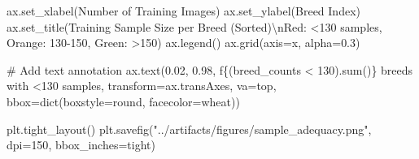 \documentclass[
  letterpaper,
  DIV=11,
  numbers=noendperiod]{scrartcl}
\newenvironment{Shaded}{\begin{snugshade}}{\end{snugshade}}
\newcommand{\BuiltInTok}[1]{\textcolor[rgb]{0.00,0.23,0.31}{#1}}
\newcommand{\CharTok}[1]{\textcolor[rgb]{0.13,0.47,0.30}{#1}}
\newcommand{\CommentTok}[1]{\textcolor[rgb]{0.37,0.37,0.37}{#1}}
\newcommand{\DecValTok}[1]{\textcolor[rgb]{0.68,0.00,0.00}{#1}}
\newcommand{\FloatTok}[1]{\textcolor[rgb]{0.68,0.00,0.00}{#1}}
\newcommand{\NormalTok}[1]{\textcolor[rgb]{0.00,0.23,0.31}{#1}}
\newcommand{\OperatorTok}[1]{\textcolor[rgb]{0.37,0.37,0.37}{#1}}
\newcommand{\SpecialCharTok}[1]{\textcolor[rgb]{0.37,0.37,0.37}{#1}}
\newcommand{\SpecialStringTok}[1]{\textcolor[rgb]{0.13,0.47,0.30}{#1}}
\newcommand{\StringTok}[1]{\textcolor[rgb]{0.13,0.47,0.30}{#1}}
\renewenvironment{Shaded}{%
  \begin{tcolorbox}[%
    enhanced,%
    colback=codebg,%
    colframe=codebg,%
    borderline west={3pt}{0pt}{sectionblue},%
    boxrule=0pt,%
    arc=0pt,%
    boxsep=5pt,%
    left=2mm,%
    right=2mm,%
    top=2mm,%
    bottom=2mm%
  ]%
}{%
  \end{tcolorbox}%
}
\begin{document}
\begin{Shaded}
\begin{Highlighting}[]
\NormalTok{ax.set\_xlabel(}\StringTok{\textquotesingle{}Number of Training Images\textquotesingle{}}\NormalTok{)}
\NormalTok{ax.set\_ylabel(}\StringTok{\textquotesingle{}Breed Index\textquotesingle{}}\NormalTok{)}
\NormalTok{ax.set\_title(}\StringTok{\textquotesingle{}Training Sample Size per Breed (Sorted)}\CharTok{\textbackslash{}n}\StringTok{Red: \textless{}130 samples, Orange: 130{-}150, Green: \textgreater{}150\textquotesingle{}}\NormalTok{)}
\NormalTok{ax.legend()}
\NormalTok{ax.grid(axis}\OperatorTok{=}\StringTok{\textquotesingle{}x\textquotesingle{}}\NormalTok{, alpha}\OperatorTok{=}\FloatTok{0.3}\NormalTok{)}

\CommentTok{\# Add text annotation}
\NormalTok{ax.text(}\FloatTok{0.02}\NormalTok{, }\FloatTok{0.98}\NormalTok{, }\SpecialStringTok{f\textquotesingle{}}\SpecialCharTok{\{}\NormalTok{(breed\_counts }\OperatorTok{\textless{}} \DecValTok{130}\NormalTok{)}\SpecialCharTok{.}\BuiltInTok{sum}\NormalTok{()}\SpecialCharTok{\}}\SpecialStringTok{ breeds with \textless{}130 samples\textquotesingle{}}\NormalTok{, }
\NormalTok{        transform}\OperatorTok{=}\NormalTok{ax.transAxes, va}\OperatorTok{=}\StringTok{\textquotesingle{}top\textquotesingle{}}\NormalTok{, bbox}\OperatorTok{=}\BuiltInTok{dict}\NormalTok{(boxstyle}\OperatorTok{=}\StringTok{\textquotesingle{}round\textquotesingle{}}\NormalTok{, facecolor}\OperatorTok{=}\StringTok{\textquotesingle{}wheat\textquotesingle{}}\NormalTok{))}

\NormalTok{plt.tight\_layout()}
\NormalTok{plt.savefig(}\StringTok{"../artifacts/figures/sample\_adequacy.png"}\NormalTok{, dpi}\OperatorTok{=}\DecValTok{150}\NormalTok{, bbox\_inches}\OperatorTok{=}\StringTok{\textquotesingle{}tight\textquotesingle{}}\NormalTok{)}


\end{Highlighting}
\end{Shaded}
\end{document}

